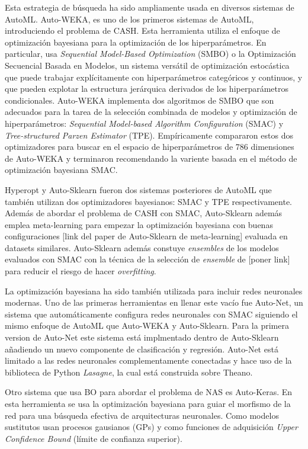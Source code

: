 Esta estrategia de búsqueda ha sido ampliamente usada en diversos sistemas de AutoML. Auto-WEKA, es uno de los primeros sistemas de AutoML, introduciendo el problema de CASH. Esta herramienta utiliza el enfoque de optimización bayesiana para la optimización de los hiperparámetros. En particular, usa \textit{Sequential Model-Based Optimization} (SMBO) o la Optimización Secuencial Basada en Modelos, un sistema versátil de optimización estocástica que puede trabajar explícitamente con hiperparámetros categóricos y continuos, y que pueden explotar la estructura jerárquica derivados de los hiperparámetros condicionales. Auto-WEKA implementa dos algoritmos de SMBO que son adecuados para la tarea de la selección combinada de modelos y optimización de hiperparámetros: \textit{Sequential Model-based Algorithm Configuration} (SMAC) y \textit{Tree-structured Parzen Estimator} (TPE). Empíricamente compararon estos dos optimizadores para buscar en el espacio de hiperparámetros de 786 dimensiones de Auto-WEKA y terminaron recomendando la variente basada en el método de optimización bayesiana SMAC.

Hyperopt y Auto-Sklearn fueron dos sistemas posteriores de AutoML que también utilizan dos optimizadores bayesianos: SMAC y TPE respectivamente. Además de abordar el problema de CASH con SMAC, Auto-Sklearn además emplea meta-learning para empezar la optimización bayesiana con buenas configuraciones [link del paper de Auto-Sklearn de meta-learning] evaluada en datasets similares. Auto-Sklearn además constuye \textit{ensembles} de los modelos evaluados con SMAC con la técnica de la selección de \textit{ensemble} de [poner link] para reducir el riesgo de hacer \textit{overfitting}. 

La optimización bayesiana ha sido también utilizada para incluir redes neuronales modernas. Uno de las primeras herramientas en llenar este vacío fue Auto-Net, un sistema que automáticamente configura redes neuronales con SMAC siguiendo el mismo enfoque de AutoML que Auto-WEKA y Auto-Sklearn. Para la primera version de Auto-Net este sistema está implmentado dentro de Auto-Sklearn añadiendo un nuevo componente de clasificación y regresión. Auto-Net está limitado a las redes neuronales complementamente conectadas y hace uso de la biblioteca de Python \textit{Lasagne}, la cual está construida sobre Theano.


Otro sistema que usa BO para abordar el problema de NAS es Auto-Keras. En esta herramienta se usa la optimización bayesiana para guiar el morfismo de la red para una búsqueda efectiva de arquitecturas neuronales. Como modelos sustitutos usan procesos gausianos (GPs) y como funciones de adquisición \textit{Upper Confidence Bound} (límite de confianza superior).

